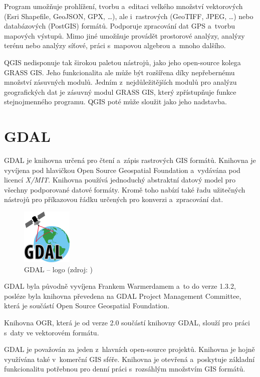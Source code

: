 \documentclass[a4paper,12pt,oneside]{book}
\begin{document}
Program umožňuje prohlížení, tvorbu a~editaci velkého množství
vektorových (Esri Shapefile, GeoJSON, GPX, \dots), ale i~rastrových
(GeoTIFF, JPEG, \dots) nebo databázových (PostGIS) formátů. Podporuje zpracování
dat GPS a~tvorbu mapových výstupů. Mimo jiné umožňuje provádět
prostorové analýzy, analýzy terénu nebo analýzy síťové, práci
s~mapovou algebrou a~mnoho dalšího.

QGIS nedisponuje tak širokou paletou nástrojů, jako jeho open-source
kolega GRASS GIS. Jeho funkcionalita ale může být rozšířena díky
nepřebernému množství zásuvných modulů. Jedním z~nejdůležitějších
modulů pro analýzu geografických dat je zásuvný modul GRASS GIS, který
zpřístupňuje funkce stejnojmenného programu. QGIS poté může sloužit
jako jeho nadstavba.  \cite{qgis} \cite{qgis_wiki}


\section{GDAL}
\label{l_gdal}

GDAL je knihovna určená pro čtení a~zápis rastrových GIS
formátů. Knihovna je vyvíjena pod hlavičkou Open Source Geospatial
Foundation a~vydávána pod licencí \textit{X/MIT}. Knihovna používá
jednoduchý abstraktní datový model pro všechny podporované datové
formáty. Kromě toho nabízí také řadu užitečných nástrojů pro
příkazovou řádku určených pro konverzi a~zpracování
dat. \cite{gdal_wiki}

\begin{figure}[h]
\centering
\includegraphics[scale=1]{images/gdal-logo.png}
\caption[GDAL -- logo]{GDAL -- logo (zdroj: \cite{gdal})}
\end{figure}

GDAL byla původně vyvíjena Frankem Warmerdamem a~to do verze 1.3.2,
posléze byla knihovna převedena na GDAL Project Management Committee,
která je součástí Open Source Geospatial Foundation.\cite{gdal_wiki}

Knihovna OGR, která je od verze 2.0 součástí knihovny GDAL, slouží pro
práci s~daty ve vektorovém formátu.\cite{gdal}

GDAL je považován za jeden z~hlavních open-source projektů. Knihovna
je hojně využívána také v~komerční GIS sféře. Knihovna je otevřená
a~poskytuje základní funkcionalitu potřebnou pro denní práci
s~rozsáhlým množstvím GIS formátů.\cite{gdal_wiki}
\end{document}
